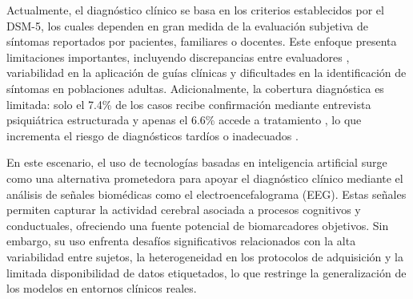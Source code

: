 Actualmente, el diagnóstico clínico se basa en los criterios establecidos por el DSM-5, los cuales dependen en gran medida de la evaluación subjetiva de síntomas reportados por pacientes, familiares o docentes. Este enfoque presenta limitaciones importantes, incluyendo discrepancias entre evaluadores \cite{Narad2015}, variabilidad en la aplicación de guías clínicas \cite{Eslami2021,Yeh2012} y dificultades en la identificación de síntomas en poblaciones adultas. Adicionalmente, la cobertura diagnóstica es limitada: solo el 7.4\% de los casos recibe confirmación mediante entrevista psiquiátrica estructurada y apenas el 6.6\% accede a tratamiento \cite{Polanczyk2014}, lo que incrementa el riesgo de diagnósticos tardíos o inadecuados \cite{DeLaViudaSuarez2021}. 

En este escenario, el uso de tecnologías basadas en inteligencia artificial surge como una alternativa prometedora para apoyar el diagnóstico clínico mediante el análisis de señales biomédicas como el electroencefalograma (EEG). Estas señales permiten capturar la actividad cerebral asociada a procesos cognitivos y conductuales, ofreciendo una fuente potencial de biomarcadores objetivos. Sin embargo, su uso enfrenta desafíos significativos relacionados con la alta variabilidad entre sujetos, la heterogeneidad en los protocolos de adquisición y la limitada disponibilidad de datos etiquetados, lo que restringe la generalización de los modelos en entornos clínicos reales.




